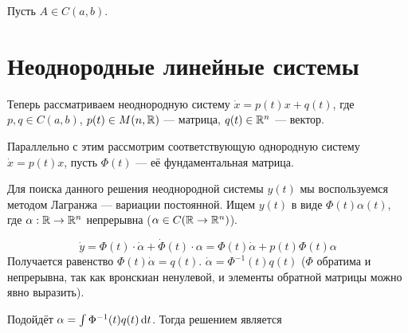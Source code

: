 \documentclass[a4paper]{report}
\begin{document}
    Пусть $A \in C(a, b)$.


    \section{Неоднородные линейные системы}
    Теперь рассматриваем неоднородную систему $\dot{x} = p(t)x + q(t)$, где $p, q \in C(a, b)$, $p(t) \in M(n, \mathbb{R})$ --- матрица, $q(t) \in \mathbb{R}^n$ --- вектор.

    Параллельно с этим рассмотрим соответствующую однородную систему $\dot{x} = p(t)x$, пусть $\Phi(t)$ --- её фундаментальная матрица.

    Для поиска данного решения неоднородной системы $y(t)$ мы воспользуемся методом Лагранжа --- вариации постоянной.
    Ищем $y(t)$ в виде $\Phi(t)\alpha(t)$, где $\alpha: \mathbb{R} \rightarrow \mathbb{R}^n$ непрерывна ($\alpha \in C(\mathbb{R} \rightarrow \mathbb{R}^n)$).

    \[\dot{y} = \Phi(t)\cdot\dot{\alpha} + \dot{\Phi}(t)\cdot \alpha = \Phi(t)\dot{\alpha} + p(t)\Phi(t)\alpha\]
    Получается равенство $\Phi(t)\dot{\alpha} = q(t)$. $\dot{\alpha} = \Phi^{-1}(t)q(t)$ ($\Phi$ обратима и непрерывна, так как вронскиан ненулевой, и элементы обратной матрицы можно явно выразить).

    Подойдёт $\alpha = \int \Phi^{-1}(t)q(t)\operatorname{d}\! t$.
    Тогда решением является 
\end{document}
